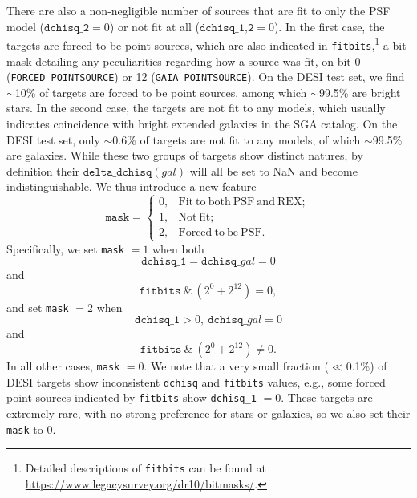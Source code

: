 \documentclass[twocolumn]{aastex631}
\begin{document}
\begin{CJK*}{UTF8}{gbsn}
There are also a non-negligible number of sources that are fit to only the PSF model ($\texttt{dchisq\_2}=0$) or not fit at all ($\texttt{dchisq\_1,2}=0$). In the first case, the targets are forced to be point sources, which are also indicated in  \texttt{fitbits},\footnote{Detailed descriptions of \texttt{fitbits} can be found at \url{https://www.legacysurvey.org/dr10/bitmasks/}.} a bit-mask detailing any peculiarities regarding how a source was fit, on bit 0 (\texttt{FORCED\_POINTSOURCE}) or 12 (\texttt{GAIA\_POINTSOURCE}). On the DESI test set, we find $\sim$10\% of targets are forced to be point sources, among which $\sim$99.5\% are bright stars. In the second case, the targets are not fit to any models, which usually indicates coincidence with bright extended galaxies in the SGA catalog. On the DESI test set, only $\sim$0.6\% of targets are not fit to any models, of which $\sim$99.5\% are galaxies. While these two groups of targets show distinct natures, by definition their $\texttt{delta\_dchisq}(gal)$ will all be set to NaN and become indistinguishable. We thus introduce a new feature
\begin{equation}\label{eq:feat_mask}
    \texttt{mask} = \left\{
    \begin{array}{cl}
        0, & \mathrm{Fit\ to\ both\ PSF\ and\ REX};\\
        1, & \mathrm{Not\ fit}; \\
        2, & \mathrm{Forced\ to\ be\ PSF}.
    \end{array}
    \right.
\end{equation}
Specifically, we set \texttt{mask} $=1$ when both 
\begin{equation*}
\texttt{dchisq\_1}=\texttt{dchisq\_}\textit{gal}=0
\end{equation*}
and
\begin{equation*}
\texttt{fitbits}\ \&\ (2^0 + 2^{12})=0,
\end{equation*}
and set \texttt{mask} $=2$ when
\begin{equation*}
\texttt{dchisq\_1}>0,\ \texttt{dchisq\_}\textit{gal}=0
\end{equation*}
and
\begin{equation*}
\texttt{fitbits}\ \&\ (2^0 + 2^{12})\neq 0.
\end{equation*}
In all other cases, \texttt{mask} $=0$. We note that a very small fraction ($\ll$0.1\%) of DESI targets show inconsistent \texttt{dchisq} and \texttt{fitbits} values, e.g., some forced point sources indicated by \texttt{fitbits} show \texttt{dchisq\_1} $=0$. These targets are extremely rare, with no strong preference for stars or galaxies, so we also set their \texttt{mask} to 0.


\end{CJK*}
\end{document}

